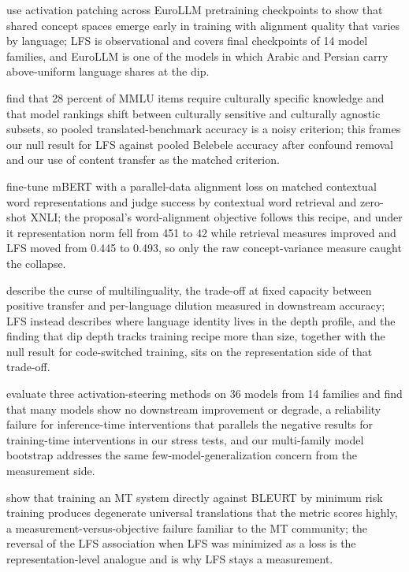 \documentclass[11pt,a4paper]{article}
\begin{document}
\citet{korner2026meanings} use activation patching across EuroLLM pretraining checkpoints to show that shared concept spaces emerge early in training with alignment quality that varies by language; LFS is observational and covers final checkpoints of 14 model families, and EuroLLM is one of the models in which Arabic and Persian carry above-uniform language shares at the dip.

\citet{singh2025globalmmlu} find that 28 percent of MMLU items require culturally specific knowledge and that model rankings shift between culturally sensitive and culturally agnostic subsets, so pooled translated-benchmark accuracy is a noisy criterion; this frames our null result for LFS against pooled Belebele accuracy after confound removal and our use of content transfer as the matched criterion.

\citet{cao2020alignment} fine-tune mBERT with a parallel-data alignment loss on matched contextual word representations and judge success by contextual word retrieval and zero-shot XNLI; the proposal's word-alignment objective follows this recipe, and under it representation norm fell from 451 to 42 while retrieval measures improved and LFS moved from 0.445 to 0.493, so only the raw concept-variance measure caught the collapse.

\citet{conneau2020unsupervised} describe the curse of multilinguality, the trade-off at fixed capacity between positive transfer and per-language dilution measured in downstream accuracy; LFS instead describes where language identity lives in the depth profile, and the finding that dip depth tracks training recipe more than size, together with the null result for code-switched training, sits on the representation side of that trade-off.

\citet{dasilva2025steering} evaluate three activation-steering methods on 36 models from 14 families and find that many models show no downstream improvement or degrade, a reliability failure for inference-time interventions that parallels the negative results for training-time interventions in our stress tests, and our multi-family model bootstrap addresses the same few-model-generalization concern from the measurement side.

\citet{yan2023bleurt} show that training an MT system directly against BLEURT by minimum risk training produces degenerate universal translations that the metric scores highly, a measurement-versus-objective failure familiar to the MT community; the reversal of the LFS association when LFS was minimized as a loss is the representation-level analogue and is why LFS stays a measurement.
\end{document}
